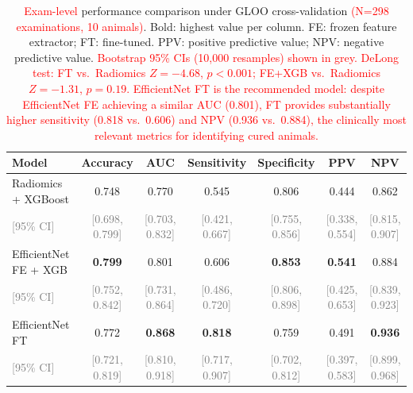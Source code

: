 \documentclass{article}
\begin{document}
\begin{table}[ht]
\centering
\small
\begin{tabular}{lcccccc}
\hline
Model & Accuracy & AUC & Sensitivity & Specificity & PPV & NPV \\
\hline

\rowcolor{red!20}
Radiomics + XGBoost &
0.748 & 0.770 & 0.545 & 0.806 & 0.444 & 0.862 \\
\rowcolor{red!20}
\textcolor{gray}{\scriptsize [95\% CI]} &
\textcolor{gray}{\scriptsize [0.698, 0.799]} &
\textcolor{gray}{\scriptsize [0.703, 0.832]} &
\textcolor{gray}{\scriptsize [0.421, 0.667]} &
\textcolor{gray}{\scriptsize [0.755, 0.856]} &
\textcolor{gray}{\scriptsize [0.338, 0.554]} &
\textcolor{gray}{\scriptsize [0.815, 0.907]} \\[2pt]

\rowcolor{red!20}
EfficientNet FE + XGB &
\textbf{0.799} & 0.801 & 0.606 & \textbf{0.853} & \textbf{0.541} & 0.884 \\
\rowcolor{red!20}
\textcolor{gray}{\scriptsize [95\% CI]} &
\textcolor{gray}{\scriptsize [0.752, 0.842]} &
\textcolor{gray}{\scriptsize [0.731, 0.864]} &
\textcolor{gray}{\scriptsize [0.486, 0.720]} &
\textcolor{gray}{\scriptsize [0.806, 0.898]} &
\textcolor{gray}{\scriptsize [0.425, 0.653]} &
\textcolor{gray}{\scriptsize [0.839, 0.923]} \\[2pt]

\rowcolor{red!20}
EfficientNet FT &
0.772 & \textbf{0.868} & \textbf{0.818} & 0.759 & 0.491 & \textbf{0.936} \\
\rowcolor{red!20}
\textcolor{gray}{\scriptsize [95\% CI]} &
\textcolor{gray}{\scriptsize [0.721, 0.819]} &
\textcolor{gray}{\scriptsize [0.810, 0.918]} &
\textcolor{gray}{\scriptsize [0.717, 0.907]} &
\textcolor{gray}{\scriptsize [0.702, 0.812]} &
\textcolor{gray}{\scriptsize [0.397, 0.583]} &
\textcolor{gray}{\scriptsize [0.899, 0.968]} \\

\hline
\end{tabular}
\caption{\textcolor{red}{Exam-level} performance comparison under GLOO cross-validation \textcolor{red}{(N=298 examinations, 10 animals)}. Bold: highest value per column. FE: frozen feature extractor; FT: fine-tuned. PPV: positive predictive value; NPV: negative predictive value. \textcolor{red}{Bootstrap 95\% CIs (10,000 resamples) shown in grey. DeLong test: FT vs.\ Radiomics $Z=-4.68$, $p<0.001$; FE+XGB vs.\ Radiomics $Z=-1.31$, $p=0.19$. EfficientNet FT is the recommended model: despite EfficientNet FE achieving a similar AUC (0.801), FT provides substantially higher sensitivity (0.818 vs.\ 0.606) and NPV (0.936 vs.\ 0.884), the clinically most relevant metrics for identifying cured animals.}}
\label{tab:all_models}
\end{table}
\end{document}
